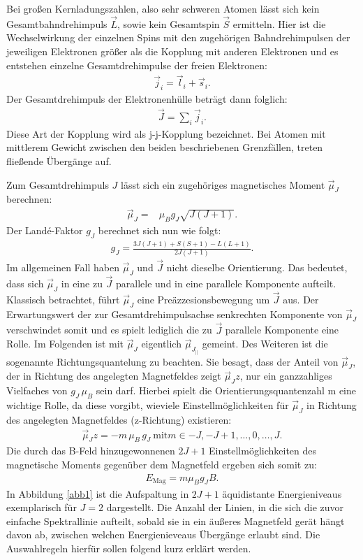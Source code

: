 \noindent Bei großen Kernladungszahlen, also sehr schweren Atomen lässt sich kein Gesamtbahndrehimpuls $\vec{L}$,
sowie kein Gesamtspin $\vec{S}$ ermitteln. Hier ist die Wechselwirkung der einzelnen Spins mit den zugehörigen
Bahndrehimpulsen der jeweiligen Elektronen größer als die Kopplung mit anderen Elektronen und es
entstehen einzelne Gesamtdrehimpulse der freien Elektronen:
\begin{align*}
    \vec{j}_i = \vec{l}_i + \vec{s}_i.
\end{align*}
Der Gesamtdrehimpuls der Elektronenhülle beträgt dann folglich:
\begin{align*}
    \vec{J} = \sum_i \vec{j}_i.
\end{align*}
Diese Art der Kopplung wird als j-j-Kopplung bezeichnet.
Bei Atomen mit mittlerem Gewicht zwischen den beiden beschriebenen Grenzfällen, treten fließende Übergänge auf.

\noindent Zum Gesamtdrehimpuls $J$ lässt sich ein zugehöriges magnetisches Moment
$\vec{\mu}_J$ berechnen:
\begin{align*}
    \vec{\mu}_J =& \mu_B g_J \sqrt{J(J+1)}.
\end{align*}
Der Landé-Faktor $g_J$ berechnet sich nun wie folgt:
\begin{align*}
    g_J = \frac{3J(J+1) + S(S+1) - L(L+1)}{2J(J+1)}.
\end{align*}
Im allgemeinen Fall haben $\vec{\mu}_J$ und $\vec{J}$ nicht dieselbe Orientierung. Das bedeutet, dass
sich $\vec{\mu}_J$ in eine zu $\vec{J}$ parallele und in eine parallele Komponente aufteilt. Klassisch
betrachtet, führt $\vec{\mu}_J$ eine Preäzzesionsbewegung um $\vec{J}$ aus. Der Erwartungswert der zur Gesamtdrehimpulsachse
senkrechten Komponente von $\vec{\mu}_J$ verschwindet somit und es spielt lediglich die zu $\vec{J}$ parallele
Komponente eine Rolle. Im Folgenden ist mit $\vec{\mu}_J$ eigentlich $\vec{\mu}_{J_{||}}$ gemeint.
Des Weiteren ist die sogenannte Richtungsquantelung zu beachten. Sie besagt, dass der Anteil von $\vec{\mu}_J$, der in Richtung
des angelegten Magnetfeldes zeigt $\vec{\mu}_Jz$, nur ein ganzzahliges Vielfaches von $g_J \, \mu_B$ sein darf.
Hierbei spielt die Orientierungsquantenzahl m eine wichtige Rolle, da diese vorgibt, wieviele Einstellmöglichkeiten
für $\vec{\mu}_J$ in Richtung des angelegten Magnetfeldes (z-Richtung) existieren:
\begin{align*}
    \vec{\mu}_Jz = - m \, \mu_B \, g_J \ \text{mit} m \in {-J, -J+1, \dots,0, \dots, J}.
\end{align*}
Die durch das B-Feld hinzugewonnenen $2J+1$ Einstellmöglichkeiten des magnetische Moments gegenüber
dem Magnetfeld ergeben sich somit zu:
\begin{align*}
    E_{\text{Mag}} = m \mu_B g_J B.
\end{align*}
In Abbildung \ref{abb1} ist die Aufspaltung in $2J+1$ äquidistante Energieniveaus exemplarisch für $J=2$
dargestellt.
Die Anzahl der Linien, in die sich die zuvor einfache Spektrallinie aufteilt, sobald
sie in ein äußeres Magnetfeld gerät hängt davon ab, zwischen welchen Energienieveaus
Übergänge erlaubt sind. Die Auswahlregeln hierfür sollen folgend kurz erklärt werden.

